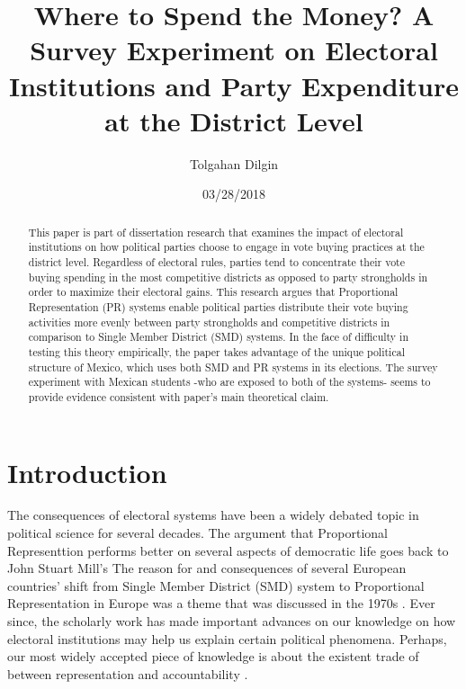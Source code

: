 \documentclass{article}
\begin{document}

	\title{Where to Spend the Money? A Survey Experiment on Electoral Institutions and Party Expenditure at the District Level}
	\author{Tolgahan Dilgin}
	\date{03/28/2018}
	\maketitle
	
\begin{abstract}
This paper is part of dissertation research that examines the impact of electoral institutions on how political parties choose to engage in vote buying practices at the district level. Regardless of electoral rules, parties tend to concentrate their vote buying spending in the most competitive districts as opposed to party strongholds in order to maximize their electoral gains. This research argues that Proportional Representation (PR) systems enable political parties distribute their vote buying activities more evenly between party strongholds and competitive districts in comparison to Single Member District (SMD) systems. In the face of difficulty in testing this theory empirically, the paper takes advantage of the unique political structure of Mexico, which uses both SMD and PR systems in its elections. The survey experiment with Mexican students -who are exposed to both of the systems- seems to provide evidence consistent with paper's main theoretical claim.
\end{abstract}

\section{Introduction}
The consequences of electoral systems have been a widely debated topic in political science for several decades. The argument that Proportional Representtion performs better on several aspects of democratic life goes back to John Stuart Mill's \cite{mill1861considerations} The reason for and consequences of several European countries' shift from Single Member District (SMD) system to Proportional Representation in Europe was a theme that was discussed in the 1970s \cite{rokkan_citizens_1970}. Ever since, the scholarly work has made important advances on our knowledge on how electoral institutions may help us explain certain political phenomena. Perhaps, our most widely accepted piece of knowledge is about the existent trade of between representation and accountability \cite{diamond1999developing}.
\end{document}
